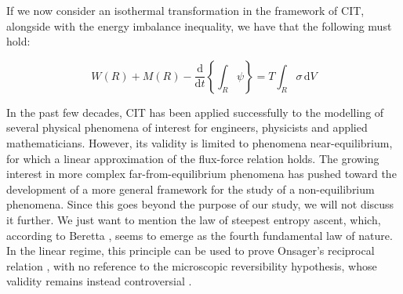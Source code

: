 \documentclass[runningheads]{llncs}
\renewcommand{\d}{\ensuremath{\text{d}}}
\begin{document}
If we now consider an isothermal transformation in the framework of CIT, alongside with the energy imbalance inequality, we have that the following must hold:

\begin{equation}
W(R)+M(R)-\frac{\d}{\d t} \left\{\int_R \psi \right\} = T \int_R \sigma \,\d V
\end{equation}

In the past few decades, CIT has been applied successfully to the modelling of several physical phenomena of interest for engineers, physicists and applied mathematicians. However, its validity is limited to phenomena near-equilibrium, for which a linear approximation of the flux-force relation holds. The growing interest in more complex far-from-equilibrium phenomena has pushed toward the development of a more general framework for the study of a non-equilibrium phenomena. Since this goes beyond the purpose of our study, we will not discuss it further. We just want to mention the law of steepest entropy ascent, which, according to Beretta \cite{SEA2}, seems to emerge as the fourth fundamental law of nature. In the linear regime, this principle can be used to prove Onsager's reciprocal relation \cite{SEA1}, with no reference to the microscopic reversibility hypothesis, whose validity remains instead controversial \cite{CIT}.
\end{document}
